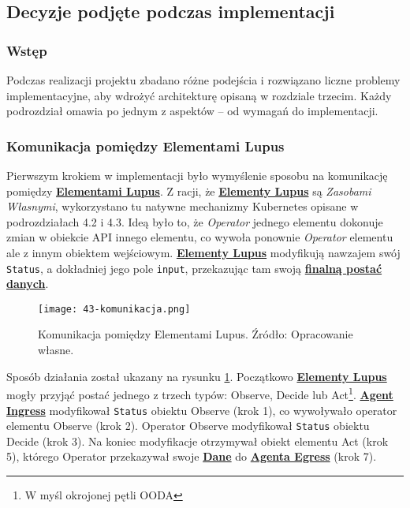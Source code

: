 \subsection{Decyzje podjęte podczas implementacji}

\subsubsection{Wstęp}

Podczas realizacji projektu zbadano różne podejścia i rozwiązano liczne problemy implementacyjne, aby wdrożyć architekturę opisaną w rozdziale trzecim. Każdy podrozdział omawia po jednym z aspektów – od wymagań do implementacji.

\subsubsection{Komunikacja pomiędzy Elementami Lupus}

Pierwszym krokiem w implementacji było wymyślenie sposobu na komunikację pomiędzy \hyperlink{def:element-lupus}{\textbf{Elementami Lupus}}. Z racji, że \hyperlink{def:element-lupus}{\textbf{Elementy Lupus}} są \textit{Zasobami Własnymi}, wykorzystano tu natywne mechanizmy Kubernetes opisane w podrozdziałach 4.2 i 4.3. Ideą było to, że \textit{Operator} jednego elementu dokonuje zmian w obiekcie API innego elementu, co wywoła ponownie \textit{Operator} elementu ale z innym obiektem wejściowym. \hyperlink{def:element-lupus}{\textbf{Elementy Lupus}} modyfikują nawzajem swój \texttt{Status}, a dokładniej jego pole \texttt{input}, przekazując tam swoją \hyperlink{def:finalne-dane}{\textbf{finalną postać danych}}.

\begin{figure}[!h]
    \centering \texttt{[image: 43-komunikacja.png]}
    \caption{Komunikacja pomiędzy Elementami Lupus. Źródło: Opracowanie własne.}\label{fig:43-komunikacja}
\end{figure}

Sposób działania został ukazany na rysunku \ref{fig:43-komunikacja}. Początkowo \hyperlink{def:element-lupus}{\textbf{Elementy Lupus}} mogły przyjąć postać jednego z trzech typów: Observe, Decide lub Act\footnote{W myśl okrojonej pętli OODA}. \hyperlink{def:agent-ingress}{\textbf{Agent Ingress}} modyfikował \texttt{Status} obiektu Observe (krok 1), co wywoływało operator elementu Observe (krok 2). Operator Observe modyfikował \texttt{Status} obiektu Decide (krok 3). Na koniec modyfikacje otrzymywał obiekt elementu Act (krok 5), którego Operator przekazywał swoje \hyperlink{def:dane}{\textbf{Dane}} do \hyperlink{def:agent-egress}{\textbf{Agenta Egress}} (krok 7). 

